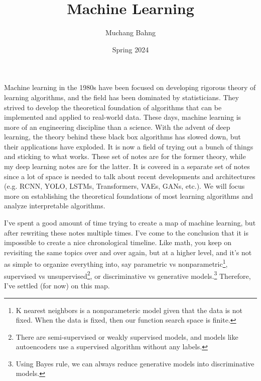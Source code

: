 \documentclass{article}
\begin{document}
\title{Machine Learning}
\author{Muchang Bahng}
\date{Spring 2024}

\maketitle
\tableofcontents
\pagebreak

Machine learning in the 1980s have been focused on developing rigorous theory of learning algorithms, and the field has been dominated by statisticians. They strived to develop the theoretical foundation of algorithms that can be implemented and applied to real-world data. These days, machine learning is more of an engineering discipline than a science. With the advent of deep learning, the theory behind these black box algorithms has slowed down, but their applications have exploded. It is now a field of trying out a bunch of things and sticking to what works. These set of notes are for the former theory, while my deep learning notes are for the latter. It is covered in a separate set of notes since a lot of space is needed to talk about recent developments and architectures (e.g. RCNN, YOLO, LSTMs, Transformers, VAEs, GANs, etc.). We will focus more on establishing the theoretical foundations of most learning algorithms and analyze interpretable algorithms. 

I've spent a good amount of time trying to create a map of machine learning, but after rewriting these notes multiple times. I've come to the conclusion that it is impossible to create a nice chronological timeline. Like math, you keep on revisiting the same topics over and over again, but at a higher level, and it's not as simple to organize everything into, say parametric vs nonparametric\footnote{K nearest neighbors is a nonparameteric model given that the data is not fixed. When the data is fixed, then our function search space is finite.}, supervised vs unsupervised\footnote{There are semi-supervised or weakly supervised models, and models like autoencoders use a supervised algorithm without any labels.}, or discriminative vs generative models.\footnote{Using Bayes rule, we can always reduce generative models into discriminative models.} Therefore, I've settled (for now) on this map. 
\end{document}

